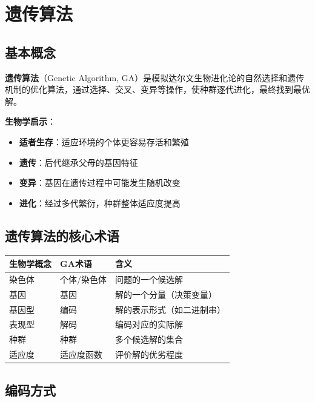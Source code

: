 \section{遗传算法}

\subsection{基本概念}

\begin{conceptbox}
\textbf{遗传算法}（Genetic Algorithm, GA）是模拟达尔文生物进化论的自然选择和遗传机制的优化算法，通过选择、交叉、变异等操作，使种群逐代进化，最终找到最优解。
\end{conceptbox}

\textbf{生物学启示}：
\begin{itemize}[leftmargin=2em,itemsep=0pt]
    \item \textbf{适者生存}：适应环境的个体更容易存活和繁殖
    \item \textbf{遗传}：后代继承父母的基因特征
    \item \textbf{变异}：基因在遗传过程中可能发生随机改变
    \item \textbf{进化}：经过多代繁衍，种群整体适应度提高
\end{itemize}

\subsection{遗传算法的核心术语}

\begin{table}[htbp]
\centering\small
\begin{tabular}{lll}
\toprule
\textbf{生物学概念} & \textbf{GA术语} & \textbf{含义} \\
\midrule
染色体 & 个体/染色体 & 问题的一个候选解 \\
基因 & 基因 & 解的一个分量（决策变量） \\
基因型 & 编码 & 解的表示形式（如二进制串） \\
表现型 & 解码 & 编码对应的实际解 \\
种群 & 种群 & 多个候选解的集合 \\
适应度 & 适应度函数 & 评价解的优劣程度 \\
\bottomrule
\end{tabular}
\end{table}

\subsection{编码方式}

